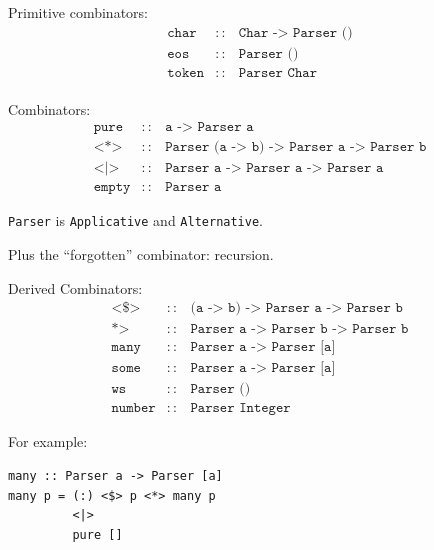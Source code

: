 \documentclass{beamer}
\begin{document}
\begin{frame}
  Primitive combinators:
  \begin{eqnarray*}
    \texttt{char}  & :: & \texttt{Char -> Parser ()} \\
    \texttt{eos}   & :: & \texttt{Parser ()} \\
    \texttt{token} & :: & \texttt{Parser Char} \\
  \end{eqnarray*}

  Combinators:
  \begin{eqnarray*}
    \texttt{pure} & :: & \texttt{a -> Parser a} \\
    \texttt{<*>} & :: & \texttt{Parser (a -> b) -> Parser a -> Parser b} \\
    \texttt{<|>} & :: & \texttt{Parser a -> Parser a -> Parser a} \\
    \texttt{empty} & :: & \texttt{Parser a}
  \end{eqnarray*}

  \bigskip

  \texttt{Parser} is \texttt{Applicative} and \texttt{Alternative}.

  \bigskip

  Plus the ``forgotten'' combinator: recursion.
\end{frame}

\begin{frame}[containsverbatim]
  Derived Combinators:
  \begin{eqnarray*}
    \texttt{<\$>}   & :: & \texttt{(a -> b) -> Parser a -> Parser b} \\
    \texttt{*>}     & :: & \texttt{Parser a -> Parser b -> Parser b} \\
    \texttt{many}   & :: & \texttt{Parser a -> Parser [a]} \\
    \texttt{some}   & :: & \texttt{Parser a -> Parser [a]} \\
    \texttt{ws}     & :: & \texttt{Parser ()} \\
    \texttt{number} & :: & \texttt{Parser Integer}
  \end{eqnarray*}

  \bigskip

  For example:
\begin{verbatim}
many :: Parser a -> Parser [a]
many p = (:) <$> p <*> many p
         <|>
         pure []
\end{verbatim}
\end{frame}
\end{document}
